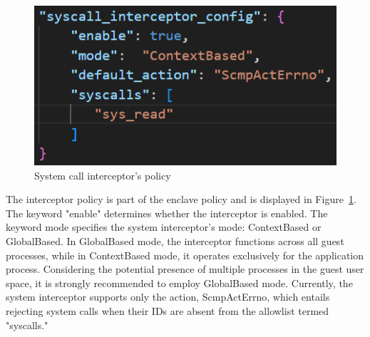 \begin{figure}[!htb]
    \centering
    \includegraphics[scale=0.4]{images/policy_system_call.png}
    \caption[System call interceptor's policy]{System call interceptor's policy}
    \label{fig:policy_system_call}
\end{figure}

The interceptor policy is part of the enclave policy and is displayed in Figure~\ref{fig:policy_system_call}. The keyword "enable" determines whether the interceptor is enabled. The keyword mode specifies the system interceptor's mode: ContextBased or GlobalBased. In GlobalBased mode, the interceptor 
functions across all guest processes, while in ContextBased mode, it operates exclusively for the application process. Considering the potential presence of multiple processes in the guest user space, it is strongly recommended to employ GlobalBased mode. Currently, the system 
interceptor supports only the action, ScmpActErrno, which entails rejecting system calls when their IDs are absent from the allowlist termed "syscalls."





